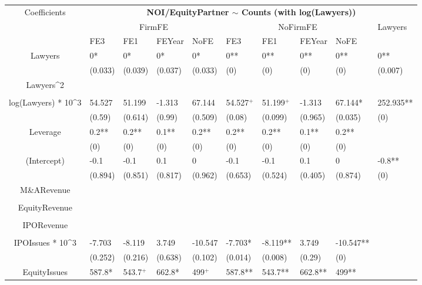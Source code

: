 \documentclass{article}
\begin{document}
\begin{table}[H]
\centering
\begin{tabular}{|clllllllll|}
\hline
\multirow{3}{*}{Coefficients} & \multicolumn{9}{c|}{\textbf{NOI/EquityPartner $\sim$ Counts (with log(Lawyers))}} \\
\cline{2-10}
& \multicolumn{4}{c}{FirmFE} & \multicolumn{4}{c}{NoFirmFE} & \multirow{2}{*}{Lawyers} \\
\cline{2-9}
& FE3 & FE1 & FEYear & NoFE & FE3 & FE1 & FEYear & NoFE &  \\
\hline
 
Lawyers & 0* & 0* & 0* & 0* & 0** & 0** & 0** & 0** & 0** \\ 
   & (0.033) & (0.039) & (0.037) & (0.033) & (0) & (0) & (0) & (0) & (0.007) \\ 
  Lawyers^2 &  &  &  &  &  &  &  &  &  \\ 
   &  &  &  &  &  &  &  &  &  \\ 
  log(Lawyers) * 10^3 & 54.527 & 51.199 & -1.313 & 67.144 & 54.527$^{+}$ & 51.199$^{+}$ & -1.313 & 67.144* & 252.935** \\ 
   & (0.59) & (0.614) & (0.99) & (0.509) & (0.08) & (0.099) & (0.965) & (0.035) & (0) \\ 
  Leverage & 0.2** & 0.2** & 0.1** & 0.2** & 0.2** & 0.2** & 0.1** & 0.2** &  \\ 
   & (0) & (0) & (0) & (0) & (0) & (0) & (0) & (0) &  \\ 
  (Intercept) & -0.1 & -0.1 & 0.1 & 0 & -0.1 & -0.1 & 0.1 & 0 & -0.8** \\ 
   & (0.894) & (0.851) & (0.817) & (0.962) & (0.653) & (0.524) & (0.405) & (0.874) & (0) \\ 
  M\&ARevenue &  &  &  &  &  &  &  &  &  \\ 
   &  &  &  &  &  &  &  &  &  \\ 
  EquityRevenue &  &  &  &  &  &  &  &  &  \\ 
   &  &  &  &  &  &  &  &  &  \\ 
  IPORevenue &  &  &  &  &  &  &  &  &  \\ 
   &  &  &  &  &  &  &  &  &  \\ 
  IPOIssues * 10^3 & -7.703 & -8.119 & 3.749 & -10.547 & -7.703* & -8.119** & 3.749 & -10.547** &  \\ 
   & (0.252) & (0.216) & (0.638) & (0.102) & (0.014) & (0.008) & (0.29) & (0) &  \\ 
  EquityIssues & 587.8* & 543.7$^{+}$ & 662.8* & 499$^{+}$ & 587.8** & 543.7** & 662.8** & 499** &  \\ 

\end{tabular}
\end{table}
\end{document}
